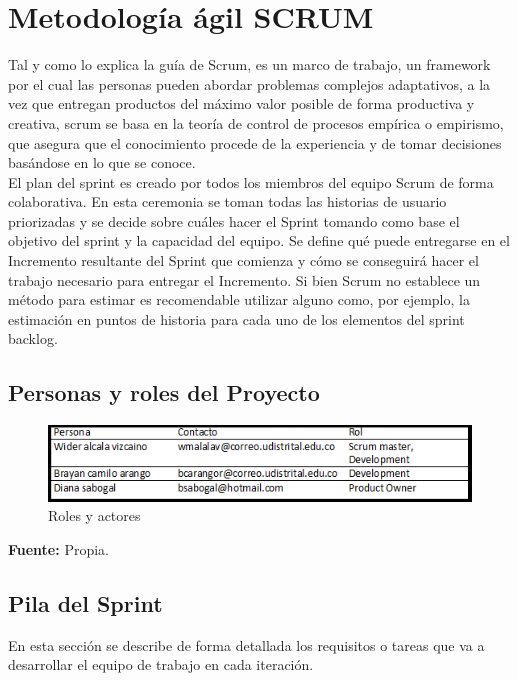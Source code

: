 \section{Metodología ágil SCRUM}

{Tal y como lo explica la guía de Scrum, es un marco de trabajo, un framework por el cual las personas pueden abordar problemas complejos adaptativos, a la vez que entregan productos del máximo valor posible de forma productiva y creativa, scrum se basa en la teoría de control de procesos empírica o empirismo, que asegura que el conocimiento procede de la experiencia y de tomar decisiones basándose en lo que se conoce.\\

El plan del sprint es creado por todos los miembros del equipo Scrum de forma colaborativa. En esta ceremonia se toman todas las historias de usuario priorizadas y se decide sobre cuáles hacer el Sprint tomando como base el objetivo del sprint y la capacidad del equipo. Se define qué puede entregarse en el Incremento resultante del Sprint que comienza y cómo se conseguirá hacer el trabajo necesario para entregar el Incremento. Si bien Scrum no establece un método para estimar es recomendable utilizar alguno como, por ejemplo, la estimación en puntos de historia para cada uno de los elementos del sprint backlog.

	\subsection{Personas y roles del Proyecto}
	{\begin{figure}[H]
		\centering
		\includegraphics[width=1\linewidth]{development/roles.png}
		\caption{Roles y actores}
	\end{figure}}
	\begin{center}
		\textbf{Fuente:} Propia.
	\end{center}
	\hfill

	\subsection{Pila del Sprint}
	{En esta sección se describe de forma detallada los requisitos o tareas que va a desarrollar el equipo de trabajo en cada iteración.
	
}}
